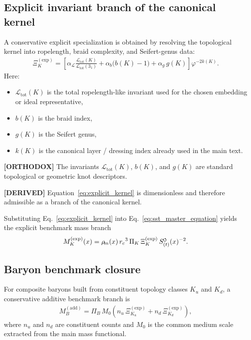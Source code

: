 \documentclass[11pt]{article}
\theoremstyle{definition}
\theoremstyle{plain}
\theoremstyle{remark}
\newcommand{\swirlarrow}{\mathchoice{\mkern-2mu\scriptstyle\boldsymbol{\circlearrowleft}}{\mkern-2mu\scriptstyle\boldsymbol{\circlearrowleft}}{\mkern-2mu\scriptscriptstyle\boldsymbol{\circlearrowleft}}{\mkern-2mu\scriptscriptstyle\boldsymbol{\circlearrowleft}}}
\newcommand{\rhoM}{\rho_{\!m}}
\newcommand{\SwirlClock}{{S_{(t)}^{\swirlarrow}}}
\newcommand{\rc}{{r_c}}
\begin{document}
    \subsection{Explicit invariant branch of the canonical kernel}
        A conservative explicit specialization is obtained by resolving the topological kernel into ropelength, braid complexity, and Seifert-genus data:
        \begin{align}
            \Xi_K^{(\mathrm{exp})}
            =
            \left[
                \alpha_{\mathcal{L}}
                \frac{\mathcal{L}_{\mathrm{tot}}(K)}{\mathcal{L}_{\mathrm{tot}}(3_1)}
                +
                \alpha_b \bigl(b(K)-1\bigr)
            +
                \alpha_g\, g(K)
            \right]
            \varphi^{-2k(K)}.
            \label{eq:explicit_kernel}
        \end{align}
        Here:
        \begin{itemize}
            \item \(\mathcal{L}_{\mathrm{tot}}(K)\) is the total ropelength-like invariant used for the chosen embedding or ideal representative,
            \item \(b(K)\) is the braid index,
            \item \(g(K)\) is the Seifert genus,
            \item \(k(K)\) is the canonical layer / dressing index already used in the main text.
        \end{itemize}
        
        \textbf{[ORTHODOX]} The invariants \(\mathcal{L}_{\mathrm{tot}}(K)\), \(b(K)\), and \(g(K)\) are standard topological or geometric knot descriptors.
        
        \textbf{[DERIVED]} Equation~\eqref{eq:explicit_kernel} is dimensionless and therefore admissible as a branch of the canonical kernel.
        
        Substituting Eq.~\eqref{eq:explicit_kernel} into Eq.~\eqref{eq:sst_master_equation} yields the explicit benchmark mass branch
        \begin{align}
            M_K^{(\mathrm{exp})}(x)
            =
            \rhoM(x)\,\rc^3\,\Pi_K\,\Xi_K^{(\mathrm{exp})}\,\SwirlClock(x)^{-2}.
            \label{eq:explicit_mass_branch}
        \end{align}
    
    \subsection{Baryon benchmark closure}
        For composite baryons built from constituent topology classes \(K_u\) and \(K_d\), a conservative additive benchmark branch is
        \begin{align}
            M_B^{(\mathrm{add})}
            =
            \Pi_B\,M_0
            \left(
                n_u\,\Xi_{K_u}^{(\mathrm{exp})}
                +
                n_d\,\Xi_{K_d}^{(\mathrm{exp})}
            \right),
            \label{eq:baryon_additive_branch}
        \end{align}
        where \(n_u\) and \(n_d\) are constituent counts and \(M_0\) is the common medium scale extracted from the main mass functional.
        
\end{document}
